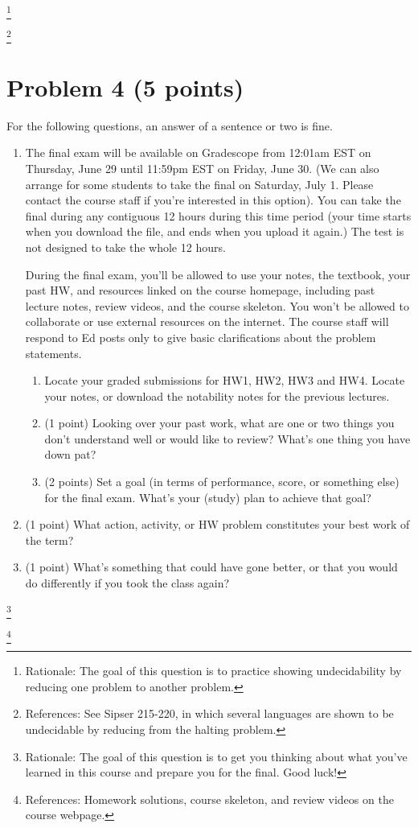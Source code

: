 \documentclass[letterpaper,11pt,twoside]{article}
\theoremstyle{plain}
\theoremstyle{definition}
\theoremstyle{remark}
\theoremstyle{restate}
\newcommand\blfootnote[1]{%
  \begingroup
  \renewcommand\thefootnote{}\footnote{#1}%
  \addtocounter{footnote}{-1}%
  \endgroup
}
\begin{document}
    
\blfootnote{ Rationale: The goal of this question is to practice showing undecidability by reducing one problem to another problem. }
\blfootnote{ References: See Sipser 215-220, in which several languages are shown to be undecidable by reducing from the halting problem. }
    
\clearpage
\section*{Problem 4 (5 points)}
    For the following questions, an answer of a sentence or two is fine.
    \begin{enumerate}
        \item The final exam will be available on Gradescope from 12:01am EST on Thursday, June 29 until 11:59pm EST on Friday, June 30. (We can also arrange for some students to take the final on Saturday, July 1. Please contact the course staff if you're interested in this option). You  can take the final during any contiguous 12 hours during this time period (your time starts when you download the file, and ends when you upload it again.) The test is not designed to take the whole 12 hours.
        
        During the final exam, you'll be allowed to use your notes, the textbook, your past HW, and resources linked on the course homepage, including past lecture notes, review videos, and the course skeleton. You won't be allowed to collaborate or use external resources on the internet. The course staff will respond to Ed posts only to give basic clarifications about the problem statements.
        \begin{enumerate}
            \item Locate your graded submissions for HW1, HW2, HW3 and HW4. Locate your notes, or download the notability notes for the previous lectures. 
            \item (1 point) Looking over your past work, what are one or two things you don't understand well or would like to review? What's one thing you have down pat?
            \item (2 points) Set a goal (in terms of performance, score, or something else) for the final exam. What's your (study) plan to achieve that goal?
        \end{enumerate}
        
        \item (1 point) What action, activity, or HW problem constitutes your best work of the term?
        \item (1 point) What's something that could have gone better, or that you would do differently if you took the class again?
    \end{enumerate}

    \blfootnote{ Rationale: The goal of this question is to get you thinking about what you've learned in this course and prepare you for the final. Good luck! }
    \blfootnote{ References: Homework solutions, course skeleton, and review videos on the course webpage. }
\end{document}

